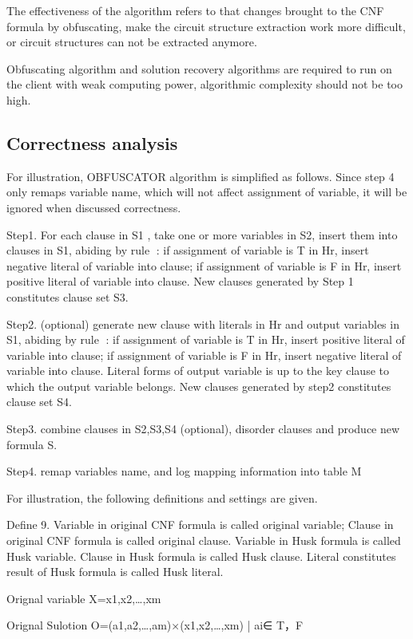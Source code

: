 \documentclass[runningheads,a4paper]{llncs}
\begin{document}
The effectiveness of the algorithm refers to that changes brought to the CNF formula by obfuscating, make the circuit structure extraction work more difficult, or circuit structures can not be extracted anymore. 

Obfuscating algorithm and solution recovery algorithms are required to run on the client with weak computing power, algorithmic complexity should not be too high.
\subsection{Correctness analysis}

For illustration, OBFUSCATOR algorithm is simplified as follows. Since step 4 only remaps variable name, which will not affect assignment of variable, it will be ignored when discussed correctness.

Step1. For each clause in S1 , take one or more variables in S2, insert them into clauses in S1, abiding by rule : if assignment of variable is T in Hr, insert negative literal of variable into clause; if assignment of variable is F in Hr, insert positive literal of variable into clause. New clauses generated by Step 1 constitutes clause set S3.

Step2. (optional) generate new clause with literals in Hr and output variables in S1, abiding by rule : if assignment of variable is T in Hr, insert positive literal of variable into clause; if assignment of variable is F in Hr, insert negative literal of variable into clause. Literal forms of output variable is up to the key clause to which the output variable belongs. New clauses generated by step2 constitutes clause set S4.

Step3. combine clauses in S2,S3,S4 (optional), disorder clauses and produce new formula S.

Step4. remap variables name, and log mapping information into table M 

For illustration, the following definitions and settings are given.

\noindent Define 9. Variable in original CNF formula is called original variable; Clause in original CNF formula is called original clause. Variable in Husk formula is called Husk variable. Clause in Husk formula is called Husk clause. Literal constitutes result of Husk formula is called Husk literal.

Orignal variable	X={x1,x2,…,xm}

Orignal Sulotion	O={(a1,a2,…,am)×(x1,x2,…,xm) | ai∈ {T，F}}
\end{document}
